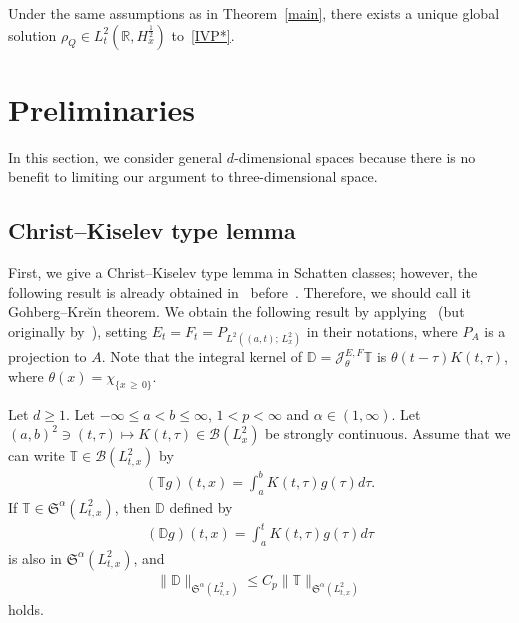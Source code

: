 \documentclass[AHL,Unicode,longabstracts,MathTools,published]{cedram}
\newcommand{\BD}{\mathbb{D}}
\newcommand{\BR}{\mathbb{R}}
\newcommand{\BT}{\mathbb{T}}
\newcommand{\CB}{\mathcal{B}}
\newcommand{\CJ}{\mathcal{J}}
\newcommand{\FS}{\mathfrak{S}}
\newcommand{\al}{\alpha}
\newcommand{\ta}{\tau}
\renewcommand{\th}{\theta}
\newcommand{\rh}{\rho}
\newcommand{\ch}{\chi}
\newcommand{\I}{\infty}
\newcommand{\tx}{{t,x}}
\newcommand{\tw}{\frac{1}{2}}
\begin{document}
\begin{theo} \label{den main}
Under the same assumptions as in Theorem~\ref{main}, there exists a unique global solution $\rh_Q \in L^2_t(\BR,H^\tw_x)$ to~\eqref{IVP*}.
\end{theo}



\section{Preliminaries}\label{sect3}

In this section, we consider general $d$-dimensional spaces because there is no benefit to limiting our argument to three-dimensional space.

\subsection{Christ--Kiselev type lemma} 

First, we give a Christ--Kiselev type lemma in Schatten classes; however, the following result is already obtained in~\cite{1970Go-Kre} before~\cite{2001CK}. Therefore, we should call it Gohberg--Kre\u{\i}n theorem. We obtain the following result by applying~\cite[Theorem~7.2]{2003BS} (but originally by~\cite[Theorem~III.6.2]{1970Go-Kre}), setting $E_t = F_t = P_{L^2((a,t);\,L^2_x)}$ in their notations, where $P_A$ is a projection to $A$. Note that the integral kernel of $\BD = \CJ^{E,F}_\th \BT$ is $\th(t-\ta)K(t,\ta)$, where $\th(x)=\ch_{\{x \,\ge\,0\}}$.

\begin{theo} \label{SCK}
Let $d \ge 1$. Let $-\I \leq a < b \leq \I$, $1 < p < \I$ and $\al \in (1,\I)$. Let $(a,b)^2 \ni (t,\ta) \mapsto K(t,\ta)\in \CB(L^2_x)$ be strongly continuous. Assume that we can write $\BT \in \CB(L^2_\tx)$ by
\begin{align}
(\BT g)(t,x) = \int_a^b K(t,\ta)g(\ta)d\ta.
\end{align}
If $\BT \in \FS^\al(L^2_\tx)$, then $\BD$ defined by
\begin{align}
(\BD g)(t,x) = \int_a^t K(t,\ta)g(\ta)d\ta
\end{align}
is also in $\FS^\al(L^2_\tx)$, and
\begin{align}
\|\BD\|_{\FS^\al\left(L^2_\tx\right)} \le C_p \|\BT\|_{\FS^\al\left(L^2_\tx\right)}
\end{align}
holds.
\end{theo}
\end{document}
